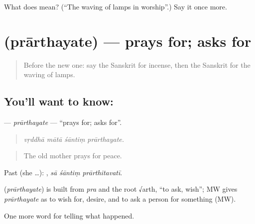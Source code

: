\begin{tcolorbox}[breakable,colback=teal!4,colframe=teal!35!black,title={Before you move on}]
What does  mean? (\textquotedblleft{}The waving of lamps in worship\textquotedblright{}.) Say it once more.
\end{tcolorbox}
\section[\texorpdfstring{\sk{प्रार्थयते} (prārthayate)}{प्रार्थयते (prārthayate)}]{ (prārthayate) — prays for; asks for}

\label{lesson:SA-C329-prarthayate}



\begin{quote}
Before the new one: say the Sanskrit for incense, then the Sanskrit for the waving of lamps.
\end{quote}

\subsection*{You'll want to know: }
\textbf{} — \emph{prārthayate} — \textquotedblleft{}prays for; asks for\textquotedblright{}.

\begin{quote}
   
\end{quote}

\begin{quote}
\emph{vṛddhā mātā śāntiṃ prārthayate.}
\end{quote}

\begin{quote}
The old mother prays for peace.
\end{quote}

Past (she …):   , \emph{sā śāntiṃ prārthitavatī}.

\begin{cousinweb}
\textbf{} (\emph{prārthayate}) is built from \emph{pra} and the root √arth, \textquotedblleft{}to ask, wish\textquotedblright{}; MW gives \emph{prārthayate} as to wish for, desire, and to ask a person for something (MW).
\end{cousinweb}

\begin{grammarlens}[title={What you've built}]
One more word for telling what happened.
\end{grammarlens}

